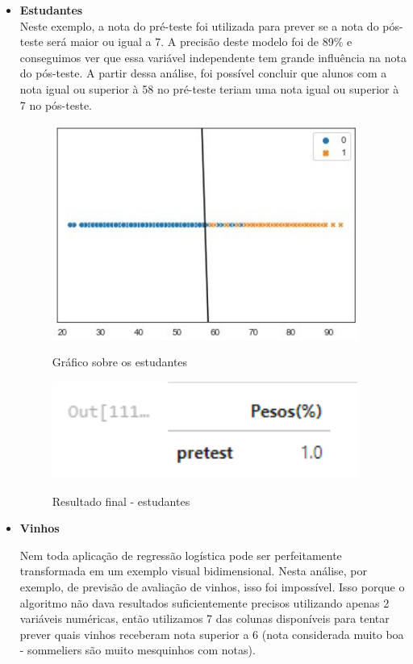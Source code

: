 \documentclass[12pt]{article}
\begin{document}
\begin{itemize}
    \item \textbf{Estudantes}\\
    
    \hspace{0.4cm}Neste exemplo, a nota do pré-teste foi utilizada para prever se a nota do pós-teste será maior ou igual a 7. A precisão deste modelo foi de 89\% e conseguimos ver que essa variável independente tem grande influência na nota do pós-teste. A partir dessa análise, foi possível concluir que alunos com a nota igual ou superior à 58 no pré-teste teriam uma nota igual ou superior à 7 no pós-teste.
    
    
    \begin{figure}[h]
    \caption{Gráfico sobre os estudantes}
    \centering
    \includegraphics[width=10cm]{estudantes.jpg}
    \label{figura:estudantes}
    \end{figure}
    
    \begin{figure}[h]
    \caption{Resultado final - estudantes}
    \centering
    \includegraphics[width=10cm]{out4.png}
    \label{figura:out3}
    \end{figure}
    
    \vspace{50px}
    
    \item \textbf{Vinhos}
    
    \hspace{0.4cm}Nem toda aplicação de regressão logística pode ser perfeitamente transformada em um exemplo visual bidimensional. Nesta análise, por exemplo, de previsão de avaliação de vinhos, isso foi impossível. Isso porque o algoritmo não dava resultados suficientemente precisos utilizando apenas 2 variáveis numéricas, então utilizamos 7 das colunas disponíveis para tentar prever quais vinhos receberam nota superior a 6 (nota considerada muito boa - sommeliers são muito mesquinhos com notas).


\end{itemize}
\end{document}
